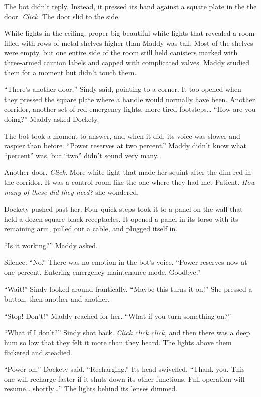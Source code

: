 \documentclass[10pt]{article}
\begin{document}
The bot didn't reply. Instead, it pressed its hand against a square
plate in the the door. \emph{Click.} The door slid to the side.

White lights in the ceiling, proper big beautiful white lights that
revealed a room filled with rows of metal shelves higher than Maddy was
tall. Most of the shelves were empty, but one entire side of the room
still held canisters marked with three-armed caution labels and capped
with complicated valves. Maddy studied them for a moment but didn't
touch them.

``There's another door,'' Sindy said, pointing to a corner. It too
opened when they pressed the square plate where a handle would normally
have been. Another corridor, another set of red emergency lights, more
tired footsteps\ldots{} ``How are you doing?'' Maddy asked Dockety.

The bot took a moment to answer, and when it did, its voice was slower
and raspier than before. ``Power reserves at two percent.'' Maddy didn't
know what ``percent'' was, but ``two'' didn't sound very many.

Another door. \emph{Click.} More white light that made her squint after
the dim red in the corridor. It was a control room like the one where
they had met Patient. \emph{How many of these did they need?} she
wondered.

Dockety pushed past her. Four quick steps took it to a panel on the wall
that held a dozen square black receptacles. It opened a panel in its
torso with its remaining arm, pulled out a cable, and plugged itself in.

``Is it working?'' Maddy asked.

Silence. ``No.'' There was no emotion in the bot's voice. ``Power
reserves now at one percent. Entering emergency maintenance mode.
Goodbye.''

``Wait!'' Sindy looked around frantically. ``Maybe this turns it on!''
She pressed a button, then another and another.

``Stop! Don't!'' Maddy reached for her. ``What if you turn something
on?''

``What if I don't?'' Sindy shot back. \emph{Click click click,} and then
there was a deep hum so low that they felt it more than they heard. The
lights above them flickered and steadied.

``Power on,'' Dockety said. ``Recharging.'' Its head swivelled. ``Thank
you. This one will recharge faster if it shuts down its other functions.
Full operation will resume\ldots{} shortly\ldots{}'' The lights behind
its lenses dimmed.
\end{document}
